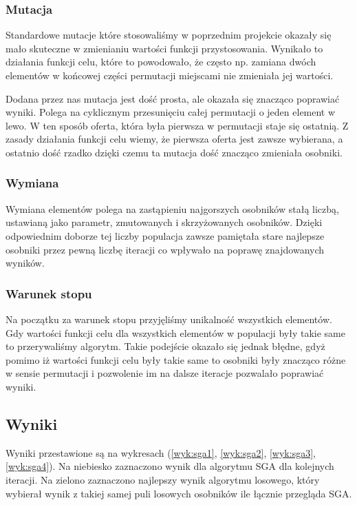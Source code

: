 \subsubsection{Mutacja}
Standardowe mutacje które stosowaliśmy w poprzednim projekcie okazały się mało skuteczne w zmienianiu wartości funkcji przystosowania. Wynikało to działania funkcji celu, które to powodowało, że często np. zamiana dwóch elementów w końcowej części permutacji miejscami nie zmieniała jej wartości.


Dodana przez nas mutacja jest dość prosta, ale okazała się znacząco poprawiać wyniki.
Polega na cyklicznym przesunięciu całej permutacji o jeden element w lewo.
W ten sposób oferta, która była pierwsza w permutacji staje się ostatnią.
Z zasady działania funkcji celu wiemy, że pierwsza oferta jest zawsze wybierana, a ostatnio dość rzadko dzięki czemu ta mutacja dość znacząco zmieniała osobniki.

\subsubsection{Wymiana}
Wymiana elementów polega na zastąpieniu najgorszych osobników stałą liczbą, ustawianą jako parametr, zmutowanych i skrzyżowanych osobników.
Dzięki odpowiednim doborze tej liczby populacja zawsze pamiętała stare najlepsze osobniki przez pewną liczbę iteracji co wpływało na poprawę znajdowanych wyników.

\subsubsection{Warunek stopu}
Na początku za warunek stopu przyjęliśmy unikalność wszystkich elementów.
Gdy wartości funkcji celu dla wszystkich elementów w populacji były takie same to przerywaliśmy algorytm.
Takie podejście okazało się jednak błędne, gdyż pomimo iż wartości funkcji celu były takie same to osobniki były znacząco różne w sensie permutacji i pozwolenie im na dalsze iteracje pozwalało poprawiać wyniki.

\subsection{Wyniki}
Wyniki przestawione są na wykresach (\ref{wyk:sga1}, \ref{wyk:sga2}, \ref{wyk:sga3}, \ref{wyk:sga4}).
Na niebiesko zaznaczono wynik dla algorytmu SGA dla kolejnych iteracji.
Na zielono zaznaczono najlepszy wynik algorytmu losowego, który wybierał wynik z takiej samej puli losowych osobników ile łącznie przegląda SGA.


